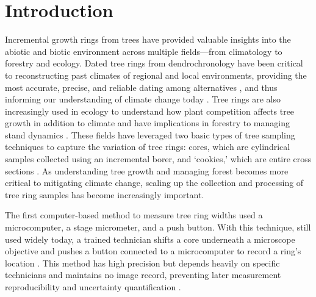 \documentclass[a4paper,12pt]{article}
\begin{document}
\section{Introduction} %
Incremental growth rings from trees have provided valuable insights into the abiotic and biotic environment across multiple fields---from climatology to forestry and ecology. Dated tree rings from dendrochronology have been critical to
reconstructing past climates of regional and local environments, providing the most accurate, precise, and reliable dating among alternatives \citep{mann_northern_1999}, and thus informing  our understanding of climate change today \citep{fritts_dendroclimatology_1971,williams_using_2010,guibal_dendrochronology_2021,sheppard_dendroclimatology_2010,williams_large_2020}. Tree rings are also increasingly used in ecology to understand how plant competition affects tree growth in addition to climate \citep{buechling_climate_2017} and have implications in forestry to managing stand dynamics \citep{canham_neighborhood_2004}. These fields have leveraged two basic types of tree sampling techniques to capture the variation of tree rings: cores, which are cylindrical samples collected using an incremental borer, and `cookies,' which are entire cross sections \citep[and thus allow measuring as many radii from the sample as desired,][]{speer_fundamentals_2010}. As understanding tree growth and managing forest becomes more critical to mitigating climate change, scaling up the collection and processing of tree ring samples has become increasingly important.

The first computer-based method to measure tree ring widths used a microcomputer, a stage micrometer, and a push button. With this technique, still used widely today, a trained technician shifts a core underneath a microscope objective and pushes a button connected to a microcomputer to record a ring's location \citep{robinson_microcomputer_1980}.
This method has high precision but depends heavily on specific technicians and maintains no image record, preventing later measurement reproducibility and uncertainty quantification \citep{levanic_atrics_2007}.
\end{document}
